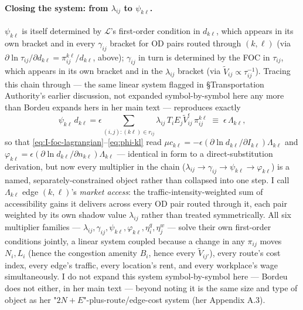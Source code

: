 \documentclass[12pt, a4paper]{article}
\theoremstyle{definition}
\theoremstyle{remark}
\begin{document}
\paragraph{Closing the system: from $\lambda_{ij}$ to $\psi_{k\ell}$.} $\psi_{k\ell}$ is itself determined by $\mathcal L$'s first-order condition in $d_{k\ell}$, which appears in its own bracket and in every $\gamma_{ij}$ bracket for OD pairs routed through $(k,\ell)$ (via $\partial\ln\tau_{ij}/\partial d_{k\ell}=\pi_{ij}^{k\ell}/d_{k\ell}$, above); $\gamma_{ij}$ in turn is determined by the FOC in $\tau_{ij}$, which appears in its own bracket and in the $\lambda_{ij}$ bracket (via $\tilde V_{ij}\propto\tau_{ij}^{-1}$). Tracing this chain through — the same linear system flagged in \S Transportation Authority's earlier discussion, not expanded symbol-by-symbol here any more than Bordeu expands hers in her main text — reproduces exactly
\[
\psi_{k\ell}\,d_{k\ell} = \epsilon\sum_{(i,j):(k\ell)\in r_{ij}}\lambda_{ij}\,T_iE_j\tilde V_{ij}^\epsilon\,\pi_{ij}^{k\ell} \;\equiv\; \epsilon\,\Lambda_{k\ell},
\]
so that \eqref{eq:I-foc-lagrangian}--\eqref{eq:phi-kl} read $\mu c_{k\ell}=-\epsilon(\partial\ln d_{k\ell}/\partial I_{k\ell})\Lambda_{k\ell}$ and $\varphi_{k\ell}=\epsilon(\partial\ln d_{k\ell}/\partial n_{k\ell})\Lambda_{k\ell}$ — identical in form to a direct-substitution derivation, but now every multiplier in the chain ($\lambda_{ij}\to\gamma_{ij}\to\psi_{k\ell}\to\varphi_{k\ell}$) is a named, separately-constrained object rather than collapsed into one step.
I call $\Lambda_{k\ell}$ edge $(k,\ell)$'s \emph{market access}: the traffic-intensity-weighted sum of accessibility gains it delivers across every OD pair routed through it, each pair weighted by its own shadow value $\lambda_{ij}$ rather than treated symmetrically. All six multiplier families — $\lambda_{ij},\gamma_{ij},\psi_{k\ell},\varphi_{k\ell},\eta_i^q,\eta_j^w$ — solve their own first-order conditions jointly, a linear system coupled because a change in any $\pi_{ij}$ moves $N_i,L_i$ (hence the congestion amenity $B_i$, hence every $\tilde V_{ij'}$), every route's cost index, every edge's traffic, every location's rent, and every workplace's wage simultaneously. I do not expand this system symbol-by-symbol here — Bordeu does not either, in her main text — beyond noting it is the same size and type of object as her "$2N+E$"-plus-route/edge-cost system (her Appendix A.3).
\end{document}
